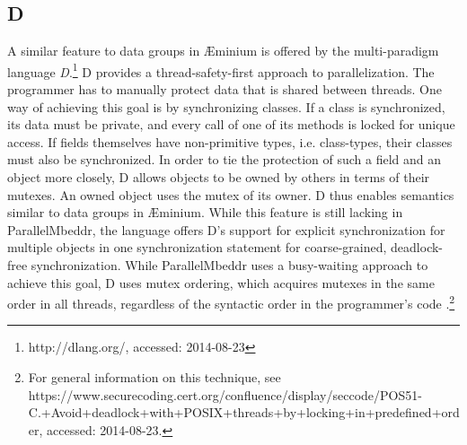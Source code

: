 \subsection{D}
A similar feature to data groups in \AE minium is offered by the multi-paradigm language \textit{D}.\footnote{http://dlang.org/, accessed: 2014-08-23} D provides a thread-safety-first approach to parallelization. The programmer has to manually protect data that is shared between threads. One way of achieving this goal is by synchronizing classes. If a class is synchronized, its data must be private, and every call of one of its methods is locked for unique access. If fields themselves have non-primitive types, i.e. class-types, their classes must also be synchronized. In order to tie the protection of such a field and an object more closely, D allows objects to be owned by others in terms of their mutexes. An owned object uses the mutex of its owner. D thus enables semantics similar to data groups in \AE minium. While this feature is still lacking in ParallelMbeddr, the language offers D's support for explicit synchronization for multiple objects in one synchronization statement for coarse-grained, deadlock-free synchronization. While ParallelMbeddr uses a busy-waiting approach to achieve this goal, D uses mutex ordering, which acquires mutexes in the same order in all threads, regardless of the syntactic order in the programmer's code \cite{ConcurrencyInTheDProgrammingLanguage}.\footnote{For general information on this technique, see https://www.securecoding.cert.org/confluence/display/seccode/POS51-C.+Avoid+deadlock+with+POSIX+threads+by+locking+in+predefined+order, accessed: 2014-08-23.}

